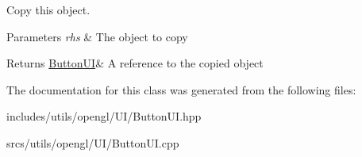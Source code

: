 Copy this object. 


\begin{DoxyParams}{Parameters}
{\em rhs} & The object to copy \\
\hline
\end{DoxyParams}
\begin{DoxyReturn}{Returns}
\hyperlink{class_button_u_i}{Button\+UI}\& A reference to the copied object 
\end{DoxyReturn}


The documentation for this class was generated from the following files\+:\begin{DoxyCompactItemize}
\item 
includes/utils/opengl/\+U\+I/Button\+U\+I.\+hpp\item 
srcs/utils/opengl/\+U\+I/Button\+U\+I.\+cpp\end{DoxyCompactItemize}
